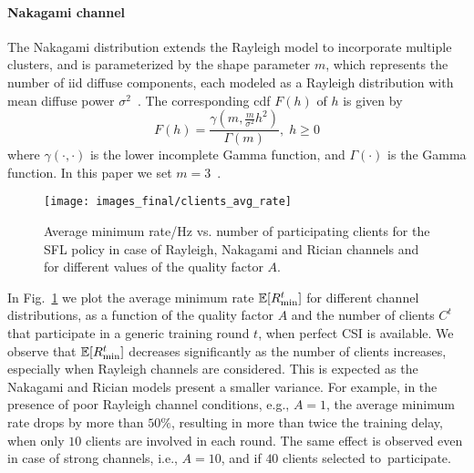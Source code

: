 \documentclass[10pt, conference, letterpaper]{IEEEtran}
\begin{document}
	\paragraph{Nakagami channel} 
	The Nakagami distribution extends the Rayleigh model to incorporate multiple clusters, and is parameterized by the shape parameter $m$, which represents the number of \gls{iid} diffuse components, each modeled as a Rayleigh distribution with mean diffuse power $\sigma^2$~\cite{NAKAGAMI19603}. The corresponding \gls{cdf} $F(h)$ of $h$ is given by
	\begin{equation}
		F(h) = \frac{\gamma(m, \frac{m}{\sigma^2} h^2)}{\Gamma(m)}, \; h \geq 0 
	\end{equation}
	where $\gamma(\cdot, \cdot)$ is the lower incomplete Gamma function, and $\Gamma(\cdot)$ is the Gamma function.
	In this paper we set $m=3$~\cite{heath2015}.
	
	
	\begin{figure}[t!]
		\centering
		\texttt{[image: images\_final/clients\_avg\_rate]}  
		\caption{Average minimum rate/Hz vs. number of participating clients for the SFL policy in case of Rayleigh, Nakagami and Rician channels and for different values of the quality factor $A$. }
		\label{fig:minimum_avg}
	\end{figure}
	
	In Fig.~\ref{fig:minimum_avg} we plot the average minimum rate $\mathbb{E}[R_{\rm min}^t]$ for different channel distributions, as a function of the  quality factor $A$ and the number of clients $C^t$ that participate in a generic training round $t$, when perfect CSI is available. 
	We observe that $\mathbb{E}[R_{\rm min}^t]$ decreases significantly as the number of clients increases, especially when Rayleigh channels are considered. This is expected as the Nakagami and Rician models present a smaller variance. For example, in the presence of poor Rayleigh channel conditions, e.g., $A = 1$, the average minimum rate drops by more than $50\%$, resulting in more than twice the training delay, when only $10$ clients are involved in each round. The same effect is observed even in case of strong channels, i.e., $A = 10$, and if $40$ clients selected to~participate. 
	
\end{document}
